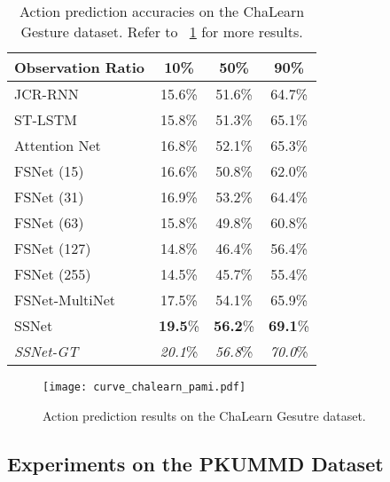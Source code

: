 \documentclass[10pt,twocolumn,letterpaper]{article}
\begin{document}
\begin{table}[htbp]
	\caption{Action prediction accuracies on the ChaLearn Gesture dataset.
        Refer to \figurename{~\ref{fig:result_curves_ChaLearn}} for more results.
	}
	\label{table:resultChaLearn}
	\centering
    \small
	\begin{tabular}{lccc}
    \toprule
    Observation Ratio                    &  10\%  & 50\%   & 90\% \\
    \midrule
    JCR-RNN                              & 15.6\% & 51.6\% & 64.7\% \\
    ST-LSTM                              & 15.8\% & 51.3\% & 65.1\% \\
    Attention Net                        & 16.8\% & 52.1\% & 65.3\% \\
    \midrule
    FSNet (15)                           & 16.6\% & 50.8\% & 62.0\% \\
    FSNet (31)                           & 16.9\% & 53.2\% & 64.4\% \\
    FSNet (63)                           & 15.8\% & 49.8\% & 60.8\% \\
    FSNet (127)                          & 14.8\% & 46.4\% & 56.4\% \\
    FSNet (255)                          & 14.5\% & 45.7\% & 55.4\% \\
    FSNet-MultiNet                       & 17.5\% & 54.1\% & 65.9\% \\
    \midrule
    SSNet                                & \textbf{19.5}\%& \textbf{56.2}\% & \textbf{69.1}\% \\
    \midrule
    \emph{SSNet-GT}                      & \emph{20.1}\% & \emph{56.8}\% & \emph{70.0}\% \\
    \bottomrule
	\end{tabular}
\end{table}

\begin{figure}[htbp]
		\centering
		\centerline{\texttt{[image: curve\_chalearn\_pami.pdf]}}
	\caption{Action prediction results on the ChaLearn Gesutre dataset.}
	\label{fig:result_curves_ChaLearn}
\end{figure}

\subsection{Experiments on the PKUMMD Dataset}
\end{document}

